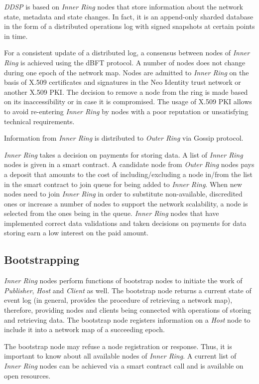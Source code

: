 \documentclass[a4paper, 11pt]{article}
\begin{document}
\textit{DDSP} is based on \textit{Inner Ring} nodes that
store information about the network state, metadata and state changes. In fact,
it is an append-only sharded database in the form of a distributed operations log
with signed snapshots at certain points in time.

For a consistent update of a distributed log, a consensus between nodes of
\textit{Inner Ring} is achieved using the dBFT protocol. A number of nodes
does not change during one epoch of the network map.
Nodes are admitted to \textit{Inner Ring} on the basis of X.509
certificates and signatures in the Neo Identity trust network or another X.509
PKI. The decision to remove a node from the ring is made based on its
inaccessibility or in case it is compromised. The usage of X.509 PKI allows to avoid
re-entering \textit{Inner Ring} by nodes with a poor reputation or unsatisfying
technical requirements.

Information from \textit{Inner Ring} is distributed to \textit{Outer Ring} via Gossip protocol.

\textit{Inner Ring} takes a decision on payments for storing data. A list of
\textit{Inner Ring} nodes is given in a smart contract. A candidate node from 
\textit{Outer Ring} nodes pays
a deposit that amounts to the cost of including/excluding a node in/from the list in
the smart contract to join queue for being added to \textit{Inner Ring}. 
When new nodes need to join \textit{Inner Ring} in order to
substitute non-available, discredited ones or increase a number of nodes to
support the network scalability, a node is selected from the ones being in the
queue. \textit{Inner Ring} nodes that have implemented correct data
validations and taken decisions on payments for data storing earn a low interest
on the paid amount.

\subsection{Bootstrapping} \textit{Inner Ring} nodes perform functions of
bootstrap nodes to initiate the work of \textit{Publisher}, \textit{Host} and \textit{Client} as well.
The bootstrap node returns a current state of event log (in general,
provides the procedure of retrieving a network map), therefore, providing nodes
and clients being connected with operations of storing and retrieving data. The
bootstrap node registers information on a \textit{Host} node to include it into a
network map of a succeeding epoch.

The bootstrap node may refuse a node registration or response.
Thus, it is important to know about all available nodes of \textit{Inner
 Ring}. A current list of \textit{Inner Ring} nodes can be achieved via a
smart contract call and is available on open resources.
\end{document}
